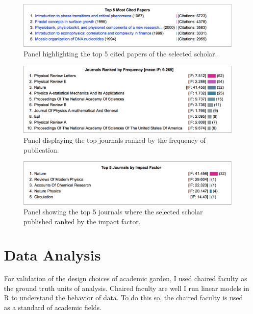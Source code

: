 \begin{figure}[H]
    \centering
    \includegraphics[width=\textwidth]{figures/fig_panel3-N}
    \caption{Panel highlighting the top 5 cited papers of the selected scholar.}
    \label{fig:panel3}
\end{figure}

\begin{figure}[H]
    \centering
    \includegraphics[width=\textwidth]{figures/fig_panel2-N}
    \caption{Panel displaying the top journals ranked by the frequency of publication.}
    \label{fig:panel2}
\end{figure}

\begin{figure}[H]
    \centering
    \includegraphics[width=\textwidth]{figures/fig_panel4-N}
    \caption{Panel showing the top 5 journals where the selected scholar published ranked by the impact factor.}
    \label{fig:panel4}
\end{figure}






\section{Data Analysis}
For validation of the design choices of academic garden, I used chaired faculty as the ground truth units of analysis. Chaired faculty are well  I run linear models in R to understand the behavior of data. To do this so, the chaired faculty is used as a standard of academic fields. 

